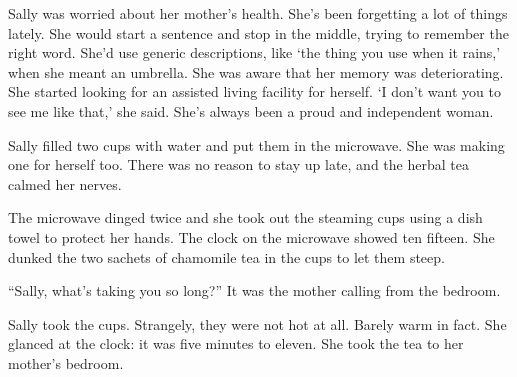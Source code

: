 \documentclass{memoir}
\begin{document}
Sally was worried about her mother's health. She's been forgetting a lot of things lately. She would start a sentence and stop in the middle, trying to remember the right word. She'd use generic descriptions, like `the thing you use when it rains,' when she meant an umbrella. She was aware that her memory was deteriorating. She started looking for an assisted living facility for herself. `I don't want you to see me like that,' she said. She's always been a proud and independent woman. 

Sally filled two cups with water and put them in the microwave. She was making one for herself too. There was no reason to stay up late, and the herbal tea calmed her nerves.

The microwave dinged twice and she took out the steaming cups using a dish towel to protect her hands. The clock on the microwave showed ten fifteen. She dunked the two sachets of chamomile tea in the cups to let them steep.

``Sally, what's taking you so long?'' It was the mother calling from the bedroom. 

Sally took the cups. Strangely, they were not hot at all. Barely warm in fact. She glanced at the clock: it was five minutes to eleven. She took the tea to her mother's bedroom.
\end{document}
